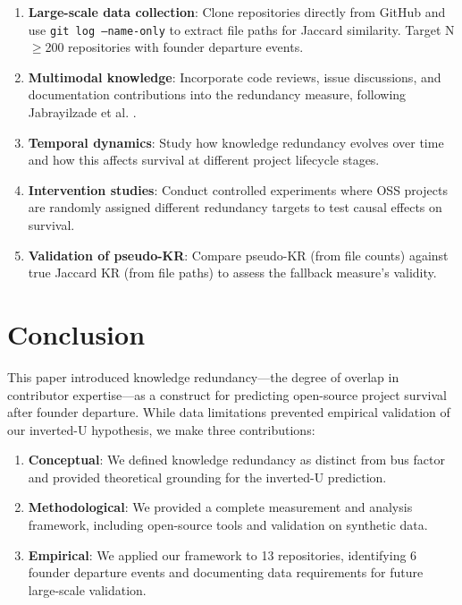 \documentclass[11pt,letterpaper]{article}
\begin{document}
\begin{enumerate}
    \item \textbf{Large-scale data collection}: Clone repositories directly from GitHub and use \texttt{git log --name-only} to extract file paths for Jaccard similarity. Target N$\geq$200 repositories with founder departure events.
    
    \item \textbf{Multimodal knowledge}: Incorporate code reviews, issue discussions, and documentation contributions into the redundancy measure, following Jabrayilzade et al. \cite{Jabrayilzade2022}.
    
    \item \textbf{Temporal dynamics}: Study how knowledge redundancy evolves over time and how this affects survival at different project lifecycle stages.
    
    \item \textbf{Intervention studies}: Conduct controlled experiments where OSS projects are randomly assigned different redundancy targets to test causal effects on survival.
    
    \item \textbf{Validation of pseudo-KR}: Compare pseudo-KR (from file counts) against true Jaccard KR (from file paths) to assess the fallback measure's validity.
\end{enumerate}

\section{Conclusion}

This paper introduced knowledge redundancy---the degree of overlap in contributor expertise---as a construct for predicting open-source project survival after founder departure. While data limitations prevented empirical validation of our inverted-U hypothesis, we make three contributions:

\begin{enumerate}
    \item \textbf{Conceptual}: We defined knowledge redundancy as distinct from bus factor and provided theoretical grounding for the inverted-U prediction.
    
    \item \textbf{Methodological}: We provided a complete measurement and analysis framework, including open-source tools and validation on synthetic data.
    
    \item \textbf{Empirical}: We applied our framework to 13 repositories, identifying 6 founder departure events and documenting data requirements for future large-scale validation.
\end{enumerate}
\end{document}
